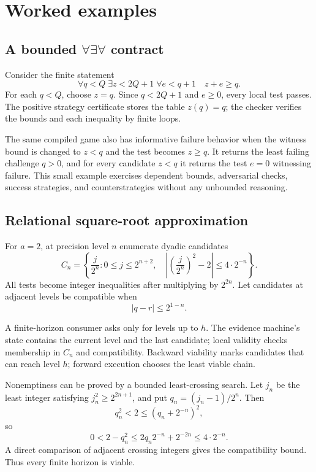\section{Worked examples}

\subsection{A bounded \texorpdfstring{\(\forall\exists\forall\)}{forall-exists-forall} contract}

Consider the finite statement
\[
  \forall q<Q\;\exists z<2Q+1\;\forall e<q+1\quad z+e\geq q.
\]
For each \(q<Q\), choose \(z=q\).  Since \(q<2Q+1\) and \(e\geq0\), every local test passes.  The positive strategy certificate stores the table \(z(q)=q\); the checker verifies the bounds and each inequality by finite loops.

The same compiled game also has informative failure behavior when the witness bound is changed to \(z<q\) and the test becomes \(z\geq q\).  It returns the least failing challenge \(q>0\), and for every candidate \(z<q\) it returns the test \(e=0\) witnessing failure.  This small example exercises dependent bounds, adversarial checks, success strategies, and counterstrategies without any unbounded reasoning.

\subsection{Relational square-root approximation}

For \(a=2\), at precision level \(n\) enumerate dyadic candidates
\[
  C_n=\left\{\frac{j}{2^n}:0\leq j\leq2^{n+2},\quad
  \left|\left(\frac{j}{2^n}\right)^2-2\right|\leq 4\cdot2^{-n}\right\}.
\]
All tests become integer inequalities after multiplying by \(2^{2n}\).  Let candidates at adjacent levels be compatible when
\[
  |q-r|\leq 2^{1-n}.
\]

A finite-horizon consumer asks only for levels up to \(h\).  The evidence machine's state contains the current level and the last candidate; local validity checks membership in \(C_n\) and compatibility.  Backward viability marks candidates that can reach level \(h\); forward execution chooses the least viable chain.

Nonemptiness can be proved by a bounded least-crossing search.  Let \(j_n\) be the least integer satisfying \(j_n^2\geq2^{2n+1}\), and put \(q_n=(j_n-1)/2^n\).  Then
\[
  q_n^2<2\leq(q_n+2^{-n})^2,
\]
so
\[
  0<2-q_n^2\leq2q_n2^{-n}+2^{-2n}\leq4\cdot2^{-n}.
\]
A direct comparison of adjacent crossing integers gives the compatibility bound.  Thus every finite horizon is viable.

